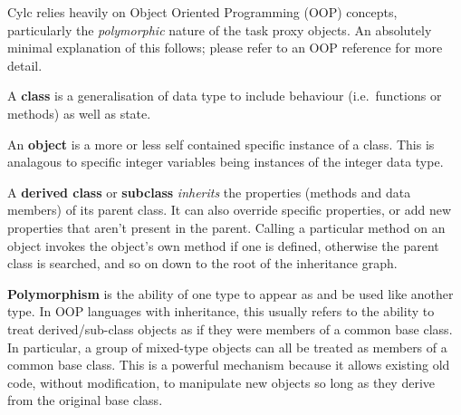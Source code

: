 \documentclass[11pt,a4paper]{article}
\begin{document}
Cylc relies heavily on Object Oriented Programming (OOP) concepts,
particularly the {\em polymorphic} nature of the task proxy objects.
An absolutely minimal explanation of this follows; 
please refer to an OOP reference for more detail.

A {\bf class} is a generalisation of data type to include behaviour
(i.e.\ functions or methods) as well as state. 


An {\bf object} is a more or less self contained specific instance
of a class. This is analagous to specific integer variables being 
instances of the integer data type.

A {\bf derived class} or {\bf subclass} {\em inherits} the properties
(methods and data members) of its parent class. It can also override
specific properties, or add new properties that aren't present in the
parent. Calling a particular method on an object invokes the object's
own method if one is defined, otherwise the parent class is searched,
and so on down to the root of the inheritance graph. 



{\bf Polymorphism} is the ability of one type to appear as and be used
like another type.  In OOP languages with inheritance, this usually
refers to the ability to treat derived/sub-class objects as if they were
members of a common base class. In particular, a group of mixed-type
objects can all be treated as members of a common base class. 
This is a powerful mechanism because it allows existing old code,
without modification, to manipulate new objects so long as they 
derive from the original base class.
\end{document}

